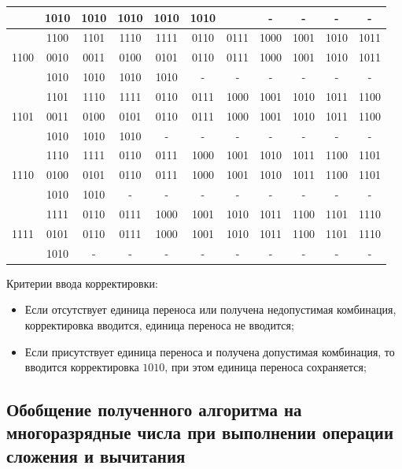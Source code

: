 \documentclass[a4paper,14pt]{article}
\begin{document}
\begin{table}[H]
\begin{tabular}{|c|c|c|c|c|c|c|c|c|c|c|}
		     & 1010 & 1010 & 1010 & 1010 & 1010 &      &  -   &  -   &  -   &  -   \\ \hline
		     & 1100 & 1101 & 1110 & 1111 & 0110 & 0111 & 1000 & 1001 & 1010 & 1011 \\
		1100 & 0010 & 0011 & 0100 & 0101 & 0110 & 0111 & 1000 & 1001 & 1010 & 1011 \\
		     & 1010 & 1010 & 1010 & 1010 &  -   &  -   &  -   &  -   &  -   &  -   \\ \hline
		     & 1101 & 1110 & 1111 & 0110 & 0111 & 1000 & 1001 & 1010 & 1011 & 1100 \\
		1101 & 0011 & 0100 & 0101 & 0110 & 0111 & 1000 & 1001 & 1010 & 1011 & 1100 \\
		     & 1010 & 1010 & 1010 &  -   &  -   &  -   &  -   &  -   &  -   &  -   \\ \hline
		     & 1110 & 1111 & 0110 & 0111 & 1000 & 1001 & 1010 & 1011 & 1100 & 1101 \\
		1110 & 0100 & 0101 & 0110 & 0111 & 1000 & 1001 & 1010 & 1011 & 1100 & 1101 \\
		     & 1010 & 1010 &  -   &  -   &  -   &  -   &  -   &  -   &  -   &  -   \\ \hline
		     & 1111 & 0110 & 0111 & 1000 & 1001 & 1010 & 1011 & 1100 & 1101 & 1110 \\
		1111 & 0101 & 0110 & 0111 & 1000 & 1001 & 1010 & 1011 & 1100 & 1101 & 1110 \\
		     & 1010 &  -   &  -   &  -   &  -   &  -   &  -   &  -   &  -   &  -   \\ \hline
	\end{tabular}
\end{table}
Критерии ввода корректировки:

\begin{itemize}
	\item Если отсутствует единица переноса или получена недопустимая комбинация, корректировка вводится, единица переноса не вводится;
	\item Если присутствует единица переноса и получена допустимая комбинация, то вводится  корректировка $1010$, при этом единица переноса сохраняется;
\end{itemize}

\subsection{Обобщение полученного алгоритма на многоразрядные числа при выполнении операции сложения и вычитания}
\end{document}
